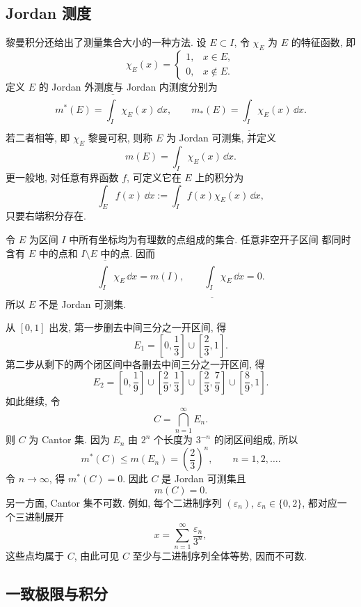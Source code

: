 \subsection{Jordan 测度}

黎曼积分还给出了测量集合大小的一种方法. 设 \(E\subset I\), 令
\(\chi_E\) 为 \(E\) 的特征函数, 即
\[
\chi_E(x)=
\begin{cases}
	1, & x\in E,\\
	0, & x\notin E.
\end{cases}
\]
定义 \(E\) 的 Jordan 外测度与 Jordan 内测度分别为
\[
m^*(E)=\overline{\int_I}\chi_E(x)\,\dd x,
\qquad
m_*(E)=\underline{\int_I}\chi_E(x)\,\dd x.
\]
若二者相等, 即 \(\chi_E\) 黎曼可积, 则称 \(E\) 为 Jordan 可测集, 并定义
\[
m(E)=\int_I\chi_E(x)\,\dd x.
\]
更一般地, 对任意有界函数 \(f\), 可定义它在 \(E\) 上的积分为
\[
\int_E f(x)\,\dd x:=\int_I f(x)\chi_E(x)\,\dd x,
\]
只要右端积分存在.

\begin{exam}
	令 \(E\) 为区间 \(I\) 中所有坐标均为有理数的点组成的集合. 任意非空开子区间
	都同时含有 \(E\) 中的点和 \(I\setminus E\) 中的点. 因而
	\[
	\overline{\int_I}\chi_E\,\dd x=m(I),
	\qquad
	\underline{\int_I}\chi_E\,\dd x=0.
	\]
	所以 \(E\) 不是 Jordan 可测集.
\end{exam}

\begin{exam}[Cantor 集]
	从 \([0,1]\) 出发, 第一步删去中间三分之一开区间, 得
	\[
	E_1=\left[0,\frac13\right]\cup\left[\frac23,1\right].
	\]
	第二步从剩下的两个闭区间中各删去中间三分之一开区间, 得
	\[
	E_2=\left[0,\frac19\right]\cup\left[\frac29,\frac13\right]
	\cup\left[\frac23,\frac79\right]\cup\left[\frac89,1\right].
	\]
	如此继续, 令
	\[
	C=\bigcap_{n=1}^{\infty}E_n.
	\]
	则 \(C\) 为 Cantor 集. 因为 \(E_n\) 由 \(2^n\) 个长度为 \(3^{-n}\) 的闭区间组成,
	所以
	\[
	m^*(C)\leq m(E_n)=\left(\frac23\right)^n,
	\qquad n=1,2,\ldots.
	\]
	令 \(n\to\infty\), 得 \(m^*(C)=0\). 因此 \(C\) 是 Jordan 可测集且
	\[
	m(C)=0.
	\]
	另一方面, Cantor 集不可数. 例如, 每个二进制序列 \((\varepsilon_n)\),
	\(\varepsilon_n\in\{0,2\}\), 都对应一个三进制展开
	\[
	x=\sum_{n=1}^{\infty}\frac{\varepsilon_n}{3^n},
	\]
	这些点均属于 \(C\), 由此可见 \(C\) 至少与二进制序列全体等势, 因而不可数.
\end{exam}

\subsection{一致极限与积分}


